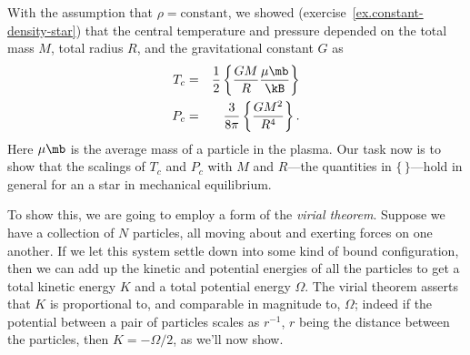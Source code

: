 With the assumption that $\rho = \textrm{constant}$, we showed (exercise~\ref{ex.constant-density-star}) that the central temperature and pressure depended on the total mass $M$, total radius $R$, and the gravitational constant $G$ as
\begin{eqnarray}
\label{e.Tc}
T_{c} &=& \frac{1}{2}\left\{\frac{GM}{R}\frac{\mu\mb}{\kB}\right\}\\
\label{e.Pc}
P_{c} &=& \frac{3}{8\pi}\left\{\frac{GM^{2}}{R^{4}}\right\}.
\end{eqnarray}
Here $\mu\mb$ is the average mass of a particle in the plasma.
Our task now is to show that the scalings of $T_{c}$ and $P_{c}$ with $M$ and $R$---the quantities in $\{\,\}$---hold in general for an a star in mechanical equilibrium.

To show this, we are going to employ a form of the \emph{virial theorem}.  Suppose we have a collection of $N$ particles, all moving about and exerting forces on one another.  If we let this system settle down into some kind of bound configuration, then we can add up the kinetic and potential energies of all the particles to get a total kinetic energy $K$ and a total potential energy $\Omega$. The virial theorem asserts that $K$ is proportional to, and comparable in magnitude to, $\Omega$; indeed if the potential between a pair of particles scales as $r^{-1}$, $r$ being the distance between the particles, then $K = -\Omega/2$, as we'll now show.


